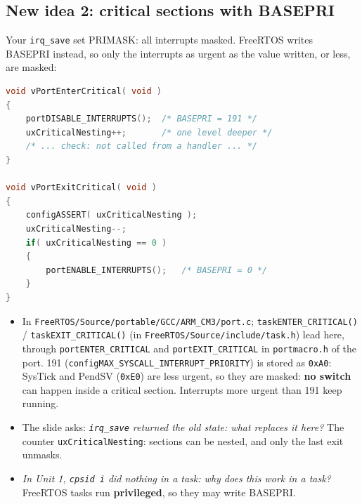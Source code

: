 \subsection{New idea 2: critical sections with BASEPRI}
Your \texttt{irq\_save} set PRIMASK: all interrupts masked. FreeRTOS writes BASEPRI instead, so only the interrupts as urgent as the value written, or less, are masked:
\begin{lstlisting}[language=C, showstringspaces=false, basicstyle=\ttfamily\scriptsize]
void vPortEnterCritical( void )
{
    portDISABLE_INTERRUPTS();  /* BASEPRI = 191 */
    uxCriticalNesting++;       /* one level deeper */
    /* ... check: not called from a handler ... */
}

void vPortExitCritical( void )
{
    configASSERT( uxCriticalNesting );
    uxCriticalNesting--;
    if( uxCriticalNesting == 0 )
    {
        portENABLE_INTERRUPTS();   /* BASEPRI = 0 */
    }
}
\end{lstlisting}
\begin{itemize}
    \item In \texttt{FreeRTOS/Source/portable/GCC/ARM\_CM3/port.c}; \texttt{taskENTER\_CRITICAL()} / \texttt{taskEXIT\_CRITICAL()} (in \texttt{FreeRTOS/Source/include/task.h}) lead here, through \texttt{portENTER\_CRITICAL} and \texttt{portEXIT\_CRITICAL} in \texttt{portmacro.h} of the port. 191 (\texttt{configMAX\_SYSCALL\_INTERRUPT\_PRIORITY}) is stored as \texttt{0xA0}: SysTick and PendSV (\texttt{0xE0}) are less urgent, so they are masked: \textbf{no switch} can happen inside a critical section. Interrupts more urgent than 191 keep running.
    \item The slide asks: \emph{\texttt{irq\_save} returned the old state: what replaces it here?} The counter \texttt{uxCriticalNesting}: sections can be nested, and only the last exit unmasks.
    \item \emph{In Unit 1, \texttt{cpsid i} did nothing in a task: why does this work in a task?} FreeRTOS tasks run \textbf{privileged}, so they may write BASEPRI.
\end{itemize}

